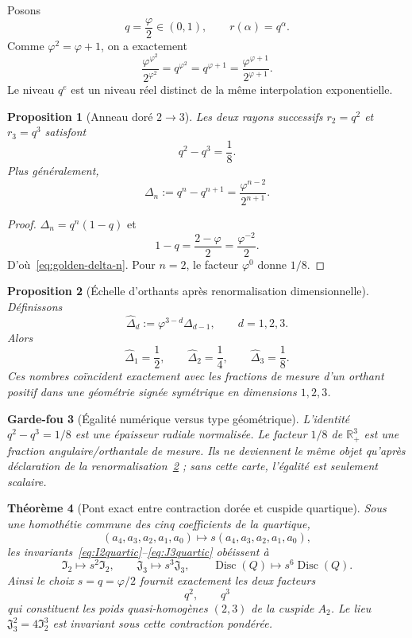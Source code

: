 \documentclass[11pt,a4paper]{article}
\newtheorem{theorem}{Théorème}[section]
\newtheorem{proposition}[theorem]{Proposition}
\newtheorem{guardrail}[theorem]{Garde-fou}
\newcommand{\R}{\mathbb R}
\newcommand{\ph}{\varphi}
\begin{document}
Posons
\[
 q=\frac{\ph}{2}\in(0,1),\qquad r(\alpha)=q^\alpha.
\]
Comme $\ph^2=\ph+1$, on a exactement
\[
 \frac{\ph^{\ph^2}}{2^{\ph^2}}=q^{\ph^2}=q^{\ph+1}=
 \frac{\ph^{\ph+1}}{2^{\ph+1}}.
\]
Le niveau $q^e$ est un niveau réel distinct de la même interpolation exponentielle.

\begin{proposition}[Anneau doré $2\to3$]\label{prop:q2q3-eighth}
Les deux rayons successifs $r_2=q^2$ et $r_3=q^3$ satisfont
\begin{equation}\label{eq:q2q3-eighth}
 \boxed{q^2-q^3=\frac18.}
\end{equation}
Plus généralement,
\begin{equation}\label{eq:golden-delta-n}
 \Delta_n:=q^n-q^{n+1}=\frac{\ph^{n-2}}{2^{n+1}}.
\end{equation}
\end{proposition}

\begin{proof}
$\Delta_n=q^n(1-q)$ et
\[
 1-q=\frac{2-\ph}{2}=\frac{\ph^{-2}}2.
\]
D'où~\eqref{eq:golden-delta-n}. Pour $n=2$, le facteur $\ph^{0}$ donne $1/8$.
\end{proof}

\begin{proposition}[Échelle d'orthants après renormalisation dimensionnelle]\label{prop:orthant-golden-ladder}
Définissons
\[
 \widehat\Delta_d:=\ph^{3-d}\Delta_{d-1},\qquad d=1,2,3.
\]
Alors
\[
 \boxed{\widehat\Delta_1=\frac12,\qquad
 \widehat\Delta_2=\frac14,\qquad
 \widehat\Delta_3=\frac18.}
\]
Ces nombres coïncident exactement avec les fractions de mesure d'un orthant positif dans une géométrie signée symétrique en dimensions $1,2,3$.
\end{proposition}

\begin{guardrail}[Égalité numérique versus type géométrique]
L'identité $q^2-q^3=1/8$ est une \emph{épaisseur radiale normalisée}. Le facteur $1/8$ de $\R_+^3$ est une \emph{fraction angulaire/orthantale} de mesure. Ils ne deviennent le même objet qu'après déclaration de la renormalisation~\ref{prop:orthant-golden-ladder} ; sans cette carte, l'égalité est seulement scalaire.
\end{guardrail}

\begin{theorem}[Pont exact entre contraction dorée et cuspide quartique]\label{thm:golden-IJ-A2}
Sous une homothétie commune des cinq coefficients de la quartique,
\[
 (a_4,a_3,a_2,a_1,a_0)\longmapsto s(a_4,a_3,a_2,a_1,a_0),
\]
les invariants~\eqref{eq:I2quartic}--\eqref{eq:J3quartic} obéissent à
\[
 \mathfrak I_2\longmapsto s^2\mathfrak I_2,
 \qquad
 \mathfrak J_3\longmapsto s^3\mathfrak J_3,
 \qquad
 \operatorname{Disc}(Q)\longmapsto s^6\operatorname{Disc}(Q).
\]
Ainsi le choix $s=q=\ph/2$ fournit exactement les deux facteurs
\[
 q^2,\qquad q^3
\]
qui constituent les poids quasi-homogènes $(2,3)$ de la cuspide $A_2$. Le lieu $\mathfrak J_3^2=4\mathfrak I_2^3$ est invariant sous cette contraction pondérée.
\end{theorem}
\end{document}

